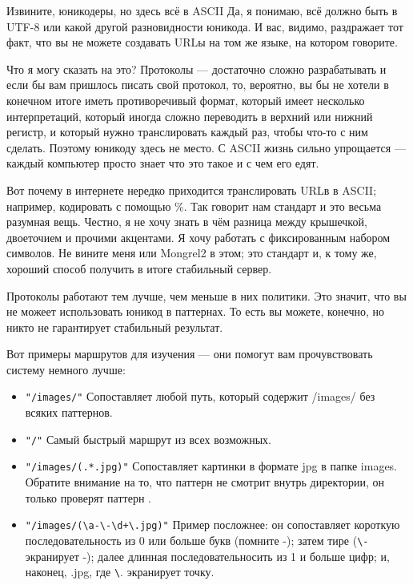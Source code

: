 \begin{aside}{Извините, юникодеры, но здесь всё в ASCII}
Да, я понимаю, всё должно быть в UTF-8 или какой другой разновидности
юникода. И вас, видимо, раздражает тот факт, что вы не можете
создавать URLы на том же языке, на котором говорите.

Что я могу сказать на это? Протоколы --- достаточно сложно
разрабатывать и если бы вам пришлось писать свой протокол, то,
вероятно, вы бы не хотели в конечном итоге иметь противоречивый
формат, который имеет несколько интерпретаций, который иногда сложно
переводить в верхний или нижний регистр, и который нужно транслировать
каждый раз, чтобы что-то с ним сделать. Поэтому юникоду здесь не
место. С ASCII жизнь сильно упрощается --- каждый компьютер просто
знает что это такое и с чем его едят.

Вот почему в интернете нередко приходится транслировать URLв в ASCII;
например, кодировать с помощью \%. Так говорит нам стандарт и это
весьма разумная вещь. Честно, я не хочу знать в чём разница между
крышечкой, двоеточием и прочими акцентами. Я хочу работать с
фиксированным набором символов. Не вините меня или Mongrel2 в этом;
это стандарт и, к тому же, хороший способ получить в итоге стабильный
сервер.

Протоколы работают тем лучше, чем меньше в них политики. Это значит,
что вы не можеет использовать юникод в паттернах. То есть вы можете,
конечно, но никто не гарантирует стабильный результат.

\end{aside}

Вот примеры маршрутов для изучения --- они помогут вам прочувствовать
систему немного лучше:

\begin{itemize}
\item \verb|"/images/"|  Сопоставляет любой путь, который содержит
/images/ без всяких паттернов.
\item \verb|"/"| Самый быстрый маршрут из всех возможных.
\item \verb|"/images/(.*.jpg)"| Сопоставляет картинки в формате jpg в
папке images. Обратите внимание на то, что паттерн не смотрит внутрь
директории, он только проверят паттерн .
\item \verb|"/images/(\a-\-\d+\.jpg)"| Пример посложнее: он
сопоставляет короткую последовательность из 0 или больше букв (помните
-); затем тире (\verb|\-| экранирует -); далее длинная
последовательносить из 1 и больше цифр; и, наконец, .jpg, где
\verb|\|. экранирует точку.
\end{itemize}

